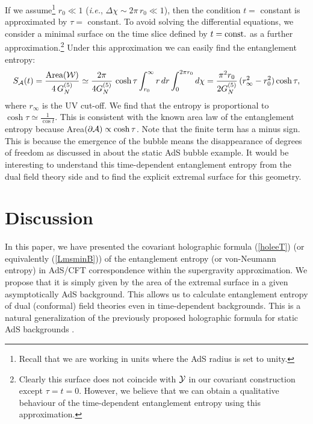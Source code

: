 \documentclass[12pt]{article}
\def\req#1{(\ref{#1})}
\def\ie{{\it i.e.}}
\def\CA{{\cal A}}
\def\CW{{\cal W}}
\def\CY{{\cal Y}}
\def\f#1#2{{\frac{#1}{#2}}}
\def\f#1#2{{\frac{#1}{#2}}}
\def\Gms{\CW}
\def\Lms{\CY}
\def\rA{\CA}
\def\de{\partial}
\def\f {\frac}
\begin{document}
If we assume\footnote{Recall that we are working in units where the
AdS radius is set to unity.} $r_0 \ll 1 $ (\ie, $\Delta\chi\sim 2\pi
\, r_0 \ll 1$), then the condition $t=$ constant is approximated by
$\tau=$ constant. To avoid solving the differential equations, we
consider a minimal surface on the time slice defined by $t={\rm const}.$
as a further approximation.\footnote{Clearly this surface does not
coincide with $\Lms$ in our covariant construction except
$\tau=t=0$. However, we believe that we can obtain a qualitative
behaviour of the time-dependent entanglement entropy using this
approximation.} Under this approximation we can easily find
the entanglement entropy:
%
\begin{equation}
S_{\rA}(t)=\f{\mbox{Area}(\Gms)}{4\, G^{(5)}_N}\simeq
\f{2\pi}{4G^{(5)}_N}\, \cosh \tau \int^\infty_{r_0} r \,
dr\int^{2\pi r_0}_0 d\chi=\f{\pi^2 r_0}{2G^{(5)}_N}\,
(r^2_{\infty}-r^2_0)\cosh \tau ,
\end{equation}
where $r_{\infty}$ is the UV cut-off. We find that the entropy is
proportional to $\cosh \tau\simeq \f{1}{\cos t}$. This is
consistent with the known area law of the entanglement entropy
because Area$(\de \rA)\propto \cosh \tau$. Note that the finite term
has a minus sign. This is because the emergence of the bubble means
the disappearance of degrees of freedom as discussed in \cite{Nishioka:2006gr}
about the static AdS bubble example. It would be interesting to understand this
 time-dependent entanglement entropy from the dual field theory side and to find
 the explicit extremal surface for this geometry.


\section{Discussion }
\label{discuss}

\hspace{.5cm} In this paper, we have presented the covariant
holographic formula \req{holeeT} (or equivalently \req{LmsminB}) of
the entanglement entropy (or von-Neumann entropy) in AdS/CFT
correspondence within the supergravity approximation. We propose that
it is simply given by the area of the extremal surface in a given
asymptotically AdS background. This allows us to calculate
entanglement entropy of dual (conformal) field theories even in
time-dependent backgrounds. This is a natural generalization of the
previously proposed holographic formula for static AdS backgrounds
\cite{Ryu:2006ef, Ryu:2006bv}.
\end{document}
